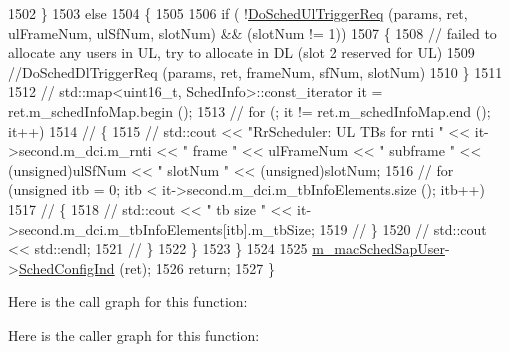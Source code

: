 \begin{DoxyCode}
1502                 \}
1503                 \textcolor{keywordflow}{else}
1504                 \{
1505 
1506                         \textcolor{keywordflow}{if} ( !\hyperlink{classns3_1_1MmWaveRrMacScheduler_a60261f8b46716986bd8d0ae245fab35a}{DoSchedUlTriggerReq} (params, ret, ulFrameNum, ulSfNum, 
      slotNum) && (slotNum != 1))
1507                         \{
1508                                 \textcolor{comment}{// failed to allocate any users in UL, try to allocate in DL (slot 2
       reserved for UL)}
1509                                 \textcolor{comment}{//DoSchedDlTriggerReq (params, ret, frameNum, sfNum, slotNum)}
1510                         \}
1511 
1512 \textcolor{comment}{//                      std::map<uint16\_t, SchedInfo>::const\_iterator it = ret.m\_schedInfoMap.begin ();}
1513 \textcolor{comment}{//                      for (; it != ret.m\_schedInfoMap.end (); it++)}
1514 \textcolor{comment}{//                      \{}
1515 \textcolor{comment}{//                              std::cout << "RrScheduler: UL TBs for rnti " << it->second.m\_dci.m\_rnti <<
       " frame " << ulFrameNum << " subframe " << (unsigned)ulSfNum << " slotNum " << (unsigned)slotNum;}
1516 \textcolor{comment}{//                              for (unsigned itb = 0; itb < it->second.m\_dci.m\_tbInfoElements.size ();
       itb++)}
1517 \textcolor{comment}{//                              \{}
1518 \textcolor{comment}{//                                      std::cout << " tb size " <<
       it->second.m\_dci.m\_tbInfoElements[itb].m\_tbSize;}
1519 \textcolor{comment}{//                              \}}
1520 \textcolor{comment}{//                              std::cout << std::endl;}
1521 \textcolor{comment}{//                      \}}
1522                 \}
1523         \}
1524 
1525         \hyperlink{classns3_1_1MmWaveRrMacScheduler_a5f6adc4e7eabd10266ede796be0d1bca}{m\_macSchedSapUser}->\hyperlink{classns3_1_1MmWaveMacSchedSapUser_ac164dd52215c3924cf421b56089eece4}{SchedConfigInd} (ret);
1526         \textcolor{keywordflow}{return};
1527 \}
\end{DoxyCode}


Here is the call graph for this function\+:




Here is the caller graph for this function\+:


